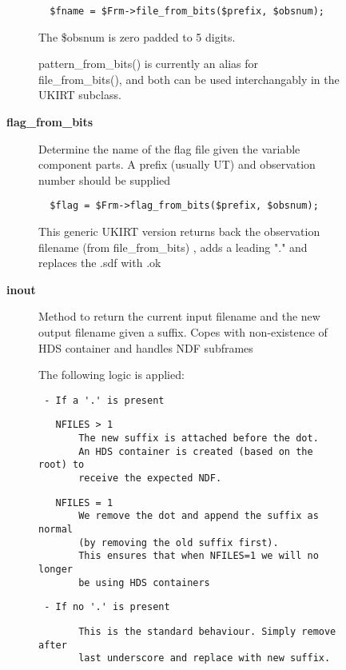 \begin{description}
\begin{description}
\begin{description}
\begin{verbatim}
  $fname = $Frm->file_from_bits($prefix, $obsnum);
\end{verbatim}


The \$obsnum is zero padded to 5 digits.



pattern\_from\_bits() is currently an alias for file\_from\_bits(),
and both can be used interchangably in the UKIRT subclass.


\item[{\textbf{flag\_from\_bits}}] \mbox{}

Determine the name of the flag file given the variable
component parts. A prefix (usually UT) and observation number
should be supplied

\begin{verbatim}
  $flag = $Frm->flag_from_bits($prefix, $obsnum);
\end{verbatim}


This generic UKIRT version returns back the observation filename (from
file\_from\_bits) , adds a leading "." and replaces the .sdf with .ok


\item[{\textbf{inout}}] \mbox{}

Method to return the current input filename and the new output
filename given a suffix.  Copes with non-existence of HDS container
and handles NDF subframes



The following logic is applied:

\begin{verbatim}
 - If a '.' is present
\end{verbatim}
\begin{verbatim}
   NFILES > 1
       The new suffix is attached before the dot.
       An HDS container is created (based on the root) to
       receive the expected NDF.
\end{verbatim}
\begin{verbatim}
   NFILES = 1
       We remove the dot and append the suffix as normal
       (by removing the old suffix first).
       This ensures that when NFILES=1 we will no longer
       be using HDS containers
\end{verbatim}
\begin{verbatim}
 - If no '.' is present
\end{verbatim}
\begin{verbatim}
       This is the standard behaviour. Simply remove after
       last underscore and replace with new suffix.
\end{verbatim}



\end{description}
\end{description}
\end{description}
